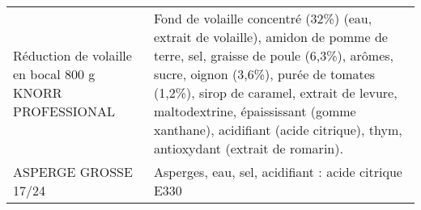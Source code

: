\begin{longtable}{p{5cm}p{10cm}}
                                                  Réduction de volaille en bocal 800 g KNORR PROFESSIONAL &                                                                                                                                                                                                                                                                                                                                                                                                                                                                                                                                                                                                                                                                                                      Fond de volaille concentré (32\%) (eau, extrait de volaille), amidon de pomme de terre, sel, graisse de poule (6,3\%), arômes, sucre, oignon (3,6\%), purée de tomates (1,2\%), sirop de caramel, extrait de levure, maltodextrine, épaississant (gomme xanthane), acidifiant (acide citrique), thym, antioxydant (extrait de romarin). \\
                                                                                     ASPERGE GROSSE 17/24 &                                                                                                                                                                                                                                                                                                                                                                                                                                                                                                                                                                                                                                                                                                                                                                                                                                                                                                                                                                                     Asperges, eau, sel, acidifiant : acide citrique E330 \\

\end{longtable}
